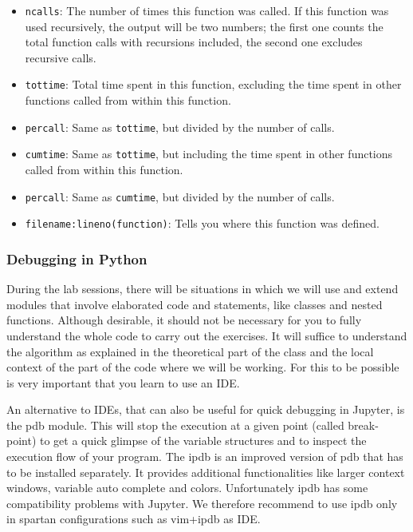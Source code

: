 \begin{itemize}
\item \texttt{ncalls}: The number of times this function was called. If this function was used recursively, the output will be two numbers; the first one counts the total function calls with recursions included, the second one excludes recursive calls.
\item \texttt{tottime}: Total time spent in this function, excluding the time spent in other functions called from within this function.
\item \texttt{percall}: Same as \texttt{tottime}, but divided by the number of calls.
\item \texttt{cumtime}: Same as \texttt{tottime}, but including the time spent in other functions called from within this function.
\item \texttt{percall}: Same as \texttt{cumtime}, but divided by the number of calls.
\item \texttt{filename:lineno(function)}: Tells you where this function was defined.
\end{itemize}

\subsubsection{Debugging in Python}

During the lab sessions, there will be situations in which we will use and extend modules that involve elaborated code and statements, like classes and nested functions. Although desirable, it should not be necessary for you to fully understand the whole code to carry out the exercises. It will suffice to understand the algorithm as explained in the theoretical part of the class and the local context of the part of the code where we will be working. For this to be possible is very important that you learn to use an IDE. 

An alternative to IDEs, that can also be useful for quick debugging in Jupyter, is the pdb module. This will stop the execution at a given point (called break-point) to get a quick glimpse of the variable structures and to inspect the execution flow of your program. The ipdb is an improved version of pdb that has to be installed separately. It provides additional functionalities like larger context windows, variable auto complete and colors. Unfortunately ipdb has some compatibility problems with Jupyter. We therefore recommend to use ipdb only in spartan configurations such as vim+ipdb as IDE.

